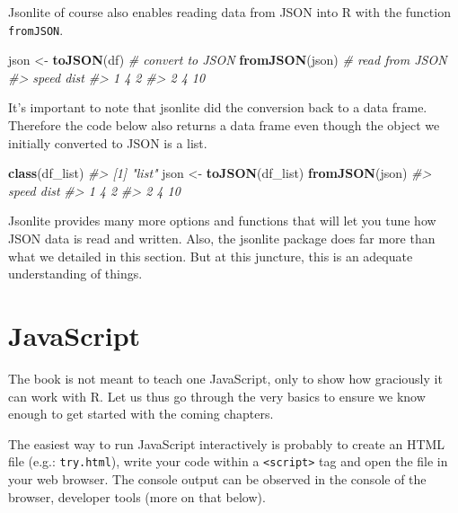 \documentclass[
  10pt,
]{krantz}
\makeatletter
\newenvironment{Shaded}{\begin{snugshade}}{\end{snugshade}}
\newcommand{\CommentTok}[1]{\textcolor[rgb]{0.37,0.37,0.37}{\textit{#1}}}
\newcommand{\KeywordTok}[1]{\textcolor[rgb]{0.27,0.27,0.27}{\textbf{#1}}}
\newcommand{\NormalTok}[1]{#1}
\newcommand{\StringTok}[1]{\textcolor[rgb]{0.5,0.5,0.5}{#1}}
\newenvironment{kframe}{%
\medskip{}
\setlength{\fboxsep}{.8em}
 \def\at@end@of@kframe{}%
 \ifinner\ifhmode%
  \def\at@end@of@kframe{\end{minipage}}%
  \begin{minipage}{\columnwidth}%
 \fi\fi%
 \def\FrameCommand##1{\hskip\@totalleftmargin \hskip-\fboxsep
 \colorbox{shadecolor}{##1}\hskip-\fboxsep
     \hskip-\linewidth \hskip-\@totalleftmargin \hskip\columnwidth}%
 \MakeFramed {\advance\hsize-\width
   \@totalleftmargin\z@ \linewidth\hsize
   \@setminipage}}%
 {\par\unskip\endMakeFramed%
 \at@end@of@kframe}
\renewenvironment{Shaded}{\begin{kframe}}{\end{kframe}}
\makeatother
\begin{document}
Jsonlite of course also enables reading data from JSON into R with the function \texttt{fromJSON}.

\begin{Shaded}
\begin{Highlighting}[]
\NormalTok{json <{-}}\StringTok{ }\KeywordTok{toJSON}\NormalTok{(df) }\CommentTok{\# convert to JSON}
\KeywordTok{fromJSON}\NormalTok{(json) }\CommentTok{\# read from JSON}
\CommentTok{\#>   speed dist}
\CommentTok{\#> 1     4    2}
\CommentTok{\#> 2     4   10}
\end{Highlighting}
\end{Shaded}

It's important to note that jsonlite did the conversion back to a data frame. Therefore the code below also returns a data frame even though the object we initially converted to JSON is a list.

\begin{Shaded}
\begin{Highlighting}[]
\KeywordTok{class}\NormalTok{(df\_list)}
\CommentTok{\#> [1] "list"}
\NormalTok{json <{-}}\StringTok{ }\KeywordTok{toJSON}\NormalTok{(df\_list)}
\KeywordTok{fromJSON}\NormalTok{(json)}
\CommentTok{\#>   speed dist}
\CommentTok{\#> 1     4    2}
\CommentTok{\#> 2     4   10}
\end{Highlighting}
\end{Shaded}

Jsonlite provides many more options and functions that will let you tune how JSON data is read and written. Also, the jsonlite package does far more than what we detailed in this section. But at this juncture, this is an adequate understanding of things.

\hypertarget{basics-javascript}{%
\section{JavaScript}\label{basics-javascript}}

The book is not meant to teach one JavaScript, only to show how graciously it can work with R. Let us thus go through the very basics to ensure we know enough to get started with the coming chapters.

The easiest way to run JavaScript interactively is probably to create an HTML file (e.g.: \texttt{try.html}), write your code within a \texttt{\textless{}script\textgreater{}} tag and open the file in your web browser. The console output can be observed in the console of the browser, developer tools (more on that below).
\end{document}
